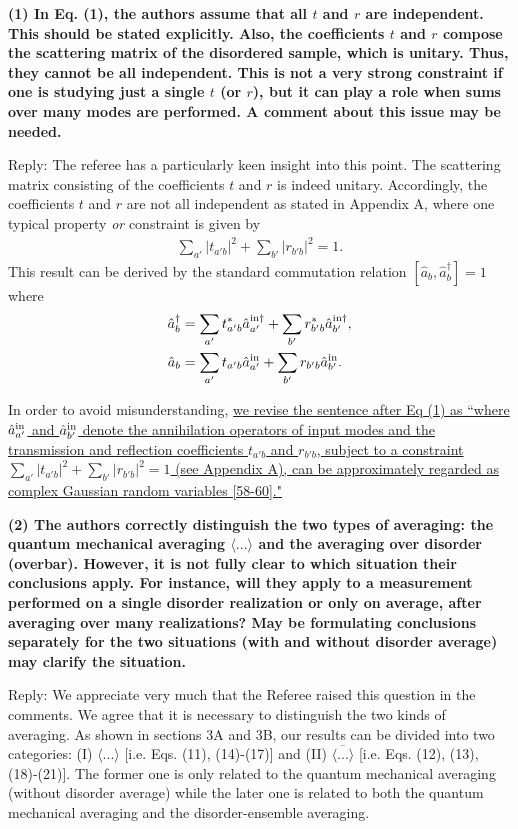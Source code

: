 \documentclass[10pt]{article}
\begin{document}
{\bf{(1) In Eq. (1), the authors assume that all $t$ and $r$ are independent. This should be stated explicitly. Also, the coefficients $t$ and $r$ compose the scattering matrix of the disordered sample, which is unitary. Thus, they cannot be all independent. This is not a very strong constraint if one is studying just a single $t$ (or $r$), but it can play a role when sums over many modes are performed. A comment about this issue may be needed. }}

Reply: The referee has a particularly keen insight into this point. The scattering matrix consisting of the coefficients $t$ and $r$ is indeed unitary. Accordingly, the coefficients $t$ and $r$ are not all independent as stated in Appendix A, where one typical property {\it{or}} constraint is given by 
\begin{align}
\sum_{a'} |t_{a'b}|^2 + \sum_{b'}|r_{b'b}|^2 = 1.
\end{align}
This result can be derived by the standard commutation relation $[ \hat{a}_{b}, \hat{a}_{b}^{\dagger}] = 1$ where
\begin{align}
\hat{a}^{\dagger}_b &= \sum_{a'} t_{a'b}^{\ast} \hat{a}^{\rm{in}\dagger}_{a'} + \sum_{b'} r_{b'b}^{\ast} \hat{a}^{\rm{in}\dagger}_{b'}, \nonumber \\
\hat{a}_b &= \sum_{a'} t_{a'b} \hat{a}^{\rm{in}}_{a'} + \sum_{b'} r_{b'b} \hat{a}^{\rm{in}}_{b'}.
\end{align}

In order to avoid misunderstanding, {\uline{we revise the sentence after Eq (1) as ``where $\hat{a}^{\rm{in}}_{a'}$ and $\hat{a}^{\rm{in}}_{b'}$ denote the annihilation operators of input modes and the transmission and reflection coefficients $t_{a' b}$ and $r_{b'b}$, subject to a constraint $\sum_{a'} |t_{a'b}|^2 + \sum_{b'} |r_{b'b}|^2 = 1$ (see Appendix A), can be approximately regarded as complex Gaussian random variables [58-60]."}}           
\newpage

{\bf{(2) The authors correctly distinguish the two types of averaging: the quantum mechanical averaging $\langle ... \rangle$ and the averaging over disorder (overbar). However, it is not fully clear to which situation their conclusions apply. For instance, will they apply to a measurement performed on a single disorder realization or only on average, after averaging over many realizations? May be formulating conclusions separately for the two situations (with and without disorder average) may clarify the situation.}}

Reply: We appreciate very much that the Referee raised this question in the comments. We agree that it is necessary to distinguish the two kinds of averaging. As shown in sections 3A and 3B, our results can be divided into two categories: (I) $\langle ... \rangle$ [i.e. Eqs. (11), (14)-(17)] and (II) $\overline{\langle ... \rangle}$ [i.e. Eqs. (12), (13), (18)-(21)]. The former one is only related to the quantum mechanical averaging (without disorder average) while the later one is related to both the quantum mechanical averaging and the disorder-ensemble averaging.
\end{document}
